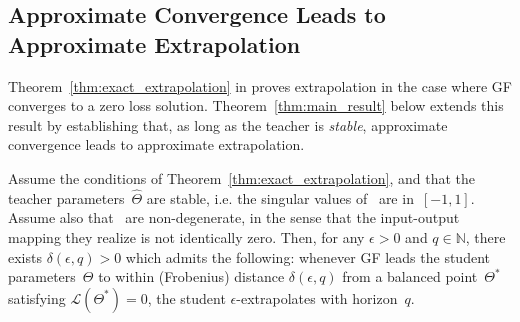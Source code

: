 \subsection{Approximate Convergence Leads to Approximate Extrapolation} \label{sec:approx_extrapolation}

Theorem~\ref{thm:exact_extrapolation} in  proves extrapolation in the case where GF converges to a zero loss solution.
Theorem~\ref{thm:main_result} below extends this result by establishing that, as long as the teacher is \emph{stable}, approximate convergence leads to approximate extrapolation.
\begin{theorem}\label{thm:main_result}
Assume the conditions of Theorem~\ref{thm:exact_extrapolation}, and that the teacher parameters~$\hat{\Theta}$ are stable, i.e. the singular values of~\smash{$\hat{\mA}$} are in~$[-1,1]$.
Assume also that~\smash{$\hat{\Theta}$} are non-degenerate, in the sense that the input-output mapping they realize is not identically zero.
Then, for any $\epsilon > 0$ and $q \in \mathbb{N}$, there exists $\delta(\epsilon, q) > 0$ which admits the following:
whenever GF leads the student parameters~$\Theta$ to within (Frobenius) distance $\delta(\epsilon,q)$ from a balanced point~$\Theta^*$ satisfying $\mathcal{L} ( \Theta^* ) = 0$, the student $\epsilon$-extrapolates with horizon~$q$. 
\end{theorem}
